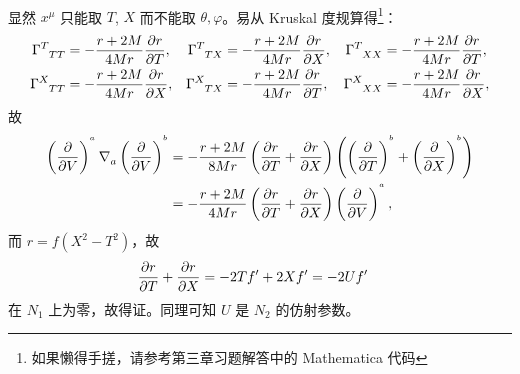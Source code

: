\begin{xiti}
\begin{zm}
\begin{enumerate}[label = (\arabic*)]
\begin{align*}
				\end{align*}
				显然 $x^\mu$ 只能取 $T$, $X$ 而不能取 $\theta, \varphi$。易从 Kruskal 度规算得\footnote{如果懒得手搓，请参考第三章习题解答中的 Mathematica 代码}：
				\begin{align*}
					\ChristoffelSymbol{T}{T}{T} &= - \frac{r + 2M}{4Mr} \pdv{r}{T}, & \ChristoffelSymbol{T}{T}{X} &= - \frac{r + 2M}{4Mr} \pdv{r}{X}, & \ChristoffelSymbol{T}{X}{X} &= - \frac{r + 2M}{4Mr} \pdv{r}{T},\\
					\ChristoffelSymbol{X}{T}{T} &= - \frac{r + 2M}{4Mr} \pdv{r}{X}, & \ChristoffelSymbol{X}{T}{X} &= - \frac{r + 2M}{4Mr} \pdv{r}{T}, & \ChristoffelSymbol{X}{X}{X} &= - \frac{r + 2M}{4Mr} \pdv{r}{X},
				\end{align*}
				故
				\begin{align*}
					\tensorp{V}{^a} \Nabla{a} \tensorp{V}{^b} &= -\frac{r + 2M}{8Mr} \left( \pdv{r}{T} + \pdv{r}{X} \right) \left( \tensorp{T}{^b} + \tensorp{X}{^b} \right)\\
					&= - \frac{r + 2M}{4Mr} \left( \pdv{r}{T} + \pdv{r}{X} \right) \tensorp{V}{^a},
				\end{align*}
				而 $r = f(X^2 - T^2)$，故
				\begin{align*}
					\pdv{r}{T} + \pdv{r}{X} &= -2 T f' + 2X f' = - 2 U f'
				\end{align*}
				在 $N_1$ 上为零，故得证。同理可知 $U$ 是 $N_2$ 的仿射参数。


\end{enumerate}
\end{zm}
\end{xiti}
